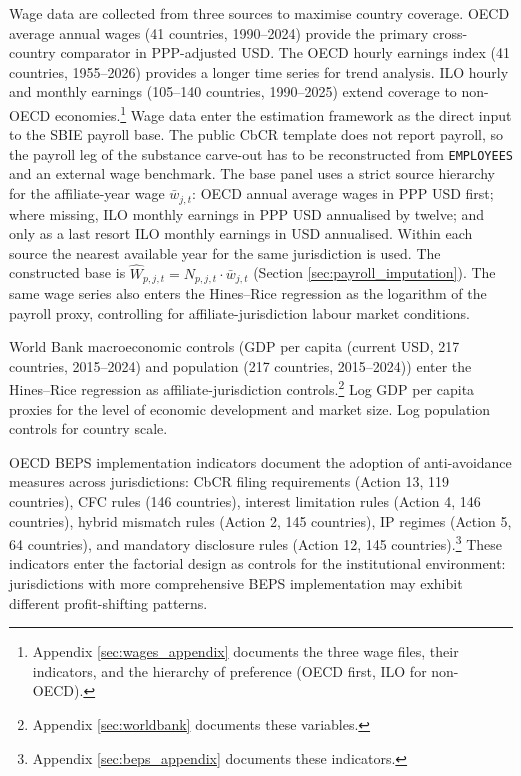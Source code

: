 \documentclass[11pt,a4paper]{article}
\newcommand{\code}[1]{\texttt{#1}}
\begin{document}
Wage data are collected from three sources to maximise country coverage. OECD average annual wages (41 countries, 1990--2024) provide the primary cross-country comparator in PPP-adjusted USD. The OECD hourly earnings index (41 countries, 1955--2026) provides a longer time series for trend analysis. ILO hourly and monthly earnings (105--140 countries, 1990--2025) extend coverage to non-OECD economies.\footnote{Appendix \ref{sec:wages_appendix} documents the three wage files, their indicators, and the hierarchy of preference (OECD first, ILO for non-OECD).} Wage data enter the estimation framework as the direct input to the SBIE payroll base. The public CbCR template does not report payroll, so the payroll leg of the substance carve-out has to be reconstructed from \code{EMPLOYEES} and an external wage benchmark. The base panel uses a strict source hierarchy for the affiliate-year wage $\bar{w}_{j,t}$: OECD annual average wages in PPP USD first; where missing, ILO monthly earnings in PPP USD annualised by twelve; and only as a last resort ILO monthly earnings in USD annualised. Within each source the nearest available year for the same jurisdiction is used. The constructed base is $\hat{W}_{p,j,t} = N_{p,j,t} \cdot \bar{w}_{j,t}$ (Section \ref{sec:payroll_imputation}). The same wage series also enters the Hines--Rice regression as the logarithm of the payroll proxy, controlling for affiliate-jurisdiction labour market conditions.

World Bank macroeconomic controls (GDP per capita (current USD, 217 countries, 2015--2024) and population (217 countries, 2015--2024)) enter the Hines--Rice regression as affiliate-jurisdiction controls.\footnote{Appendix \ref{sec:worldbank} documents these variables.} Log GDP per capita proxies for the level of economic development and market size. Log population controls for country scale.

OECD BEPS implementation indicators document the adoption of anti-avoidance measures across jurisdictions: CbCR filing requirements (Action 13, 119 countries), CFC rules (146 countries), interest limitation rules (Action 4, 146 countries), hybrid mismatch rules (Action 2, 145 countries), IP regimes (Action 5, 64 countries), and mandatory disclosure rules (Action 12, 145 countries).\footnote{Appendix \ref{sec:beps_appendix} documents these indicators.} These indicators enter the factorial design as controls for the institutional environment: jurisdictions with more comprehensive BEPS implementation may exhibit different profit-shifting patterns.
\end{document}
